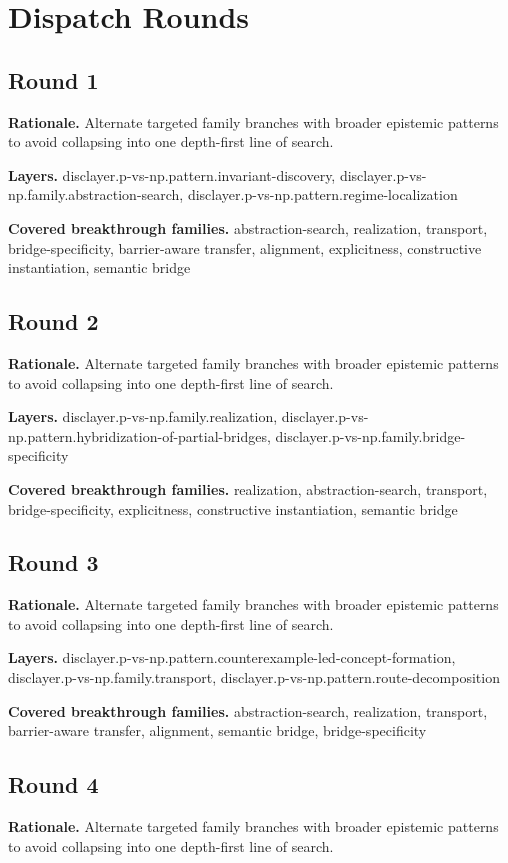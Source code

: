 \documentclass[11pt]{article}
\begin{document}
\section{Dispatch Rounds}
\subsection*{Round 1}
\textbf{Rationale.} Alternate targeted family branches with broader epistemic patterns to avoid collapsing into one depth-first line of search.

\textbf{Layers.} disclayer.p-vs-np.pattern.invariant-discovery, disclayer.p-vs-np.family.abstraction-search, disclayer.p-vs-np.pattern.regime-localization

\textbf{Covered breakthrough families.} abstraction-search, realization, transport, bridge-specificity, barrier-aware transfer, alignment, explicitness, constructive instantiation, semantic bridge
\subsection*{Round 2}
\textbf{Rationale.} Alternate targeted family branches with broader epistemic patterns to avoid collapsing into one depth-first line of search.

\textbf{Layers.} disclayer.p-vs-np.family.realization, disclayer.p-vs-np.pattern.hybridization-of-partial-bridges, disclayer.p-vs-np.family.bridge-specificity

\textbf{Covered breakthrough families.} realization, abstraction-search, transport, bridge-specificity, explicitness, constructive instantiation, semantic bridge
\subsection*{Round 3}
\textbf{Rationale.} Alternate targeted family branches with broader epistemic patterns to avoid collapsing into one depth-first line of search.

\textbf{Layers.} disclayer.p-vs-np.pattern.counterexample-led-concept-formation, disclayer.p-vs-np.family.transport, disclayer.p-vs-np.pattern.route-decomposition

\textbf{Covered breakthrough families.} abstraction-search, realization, transport, barrier-aware transfer, alignment, semantic bridge, bridge-specificity
\subsection*{Round 4}
\textbf{Rationale.} Alternate targeted family branches with broader epistemic patterns to avoid collapsing into one depth-first line of search.
\end{document}
